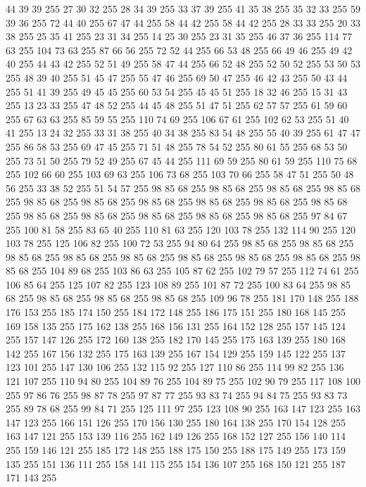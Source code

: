 44 39 39 255 27 30 32 255 28 34 39 255 33 37 39 255 41 35 38 255 35 32 33 255 59 39 36 255 72 44 40 255 67 47 44 255 58 44 42 255 58 44 42 255 28 33 33 255 20 33 38 255 25 35 41 255 23 31 34 255 14 25 30 255 23 31 35 255 46 37 36 255 114 77 63 255 104 73 63 255 87 66 56 255 72 52 44 255 66 53 48 255 66 49 46 255 49 42 40 255 44 43 42 255 52 51 49 255 58 47 44 255 66 52 48 255 52 50 52 255 53 50 53 255 48 39 40 255 51 45 47 255 55 47 46 255 69 50 47 255 46 42 43 255 50 43 44 255 51 41 39 255 49 45 45 255 60 53 54 255 45 45 51 255 18 32 46 255 15 31 43 255 13 23 33 255 47 48 52 255 44 45 48 255 51 47 51 255 62 57 57 255 61 59 60 255 67 63 63 255 85 59 55 255 110 74 69 255 106 67 61 255 102 62 53 255 51 40 41 255 13 24 32 255 33 31 38 255 40 34 38 255 83 54 48 255 55 40 39 255 61 47 47 255 86 58 53 255 69 47 45 255 71 51 48 255
78 54 52 255 80 61 55 255 68 53 50 255 73 51 50 255 79 52 49 255 67 45 44 255 111 69 59 255 80 61 59 255 110 75 68 255 102 66 60 255 103 69 63 255 106 73 68 255 103 70 66 255 58 47 51 255 50 48 56 255 33 38 52 255 51 54 57 255 98 85 68 255 98 85 68 255 98 85 68 255 98 85 68 255 98 85 68 255 98 85 68 255 98 85 68 255 98 85 68 255 98 85 68 255 98 85 68 255 98 85 68 255 98 85 68 255 98 85 68 255 98 85 68 255 98 85 68 255 97 84 67 255 100 81 58 255 83 65 40 255 110 81 63 255 120 103 78 255 132 114 90 255 120 103 78 255 125 106 82 255 100 72 53 255 94 80 64 255 98 85 68 255 98 85 68 255 98 85 68 255 98 85 68 255 98 85 68 255 98 85 68 255 98 85 68 255 98 85 68 255 98 85 68 255 104 89 68 255 103 86 63 255 105 87 62 255 102 79 57 255 112 74 61 255 106 85 64 255 125 107 82 255 123 108 89 255 101 87 72 255 100 83 64 255 98 85 68 255 98 85 68 255 98 85 68 255
98 85 68 255 109 96 78 255 181 170 148 255 188 176 153 255 185 174 150 255 184 172 148 255 186 175 151 255 180 168 145 255 169 158 135 255 175 162 138 255 168 156 131 255 164 152 128 255 157 145 124 255 157 147 126 255 172 160 138 255 182 170 145 255 175 163 139 255 180 168 142 255 167 156 132 255 175 163 139 255 167 154 129 255 159 145 122 255 137 123 101 255 147 130 106 255 132 115 92 255 127 110 86 255 114 99 82 255 136 121 107 255 110 94 80 255 104 89 76 255 104 89 75 255 102 90 79 255 117 108 100 255 97 86 76 255 98 87 78 255 97 87 77 255 93 83 74 255 94 84 75 255 93 83 73 255 89 78 68 255 99 84 71 255 125 111 97 255 123 108 90 255 163 147 123 255 163 147 123 255 166 151 126 255 170 156 130 255 180 164 138 255 170 154 128 255 163 147 121 255 153 139 116 255 162 149 126 255 168 152 127 255 156 140 114 255 159 146 121 255 185 172 148 255 188 175 150 255 188 175 149 255 173 159 135 255 151 136 111 255 158 141 115 255 154 136 107 255 168 150 121 255 187 171 143 255
